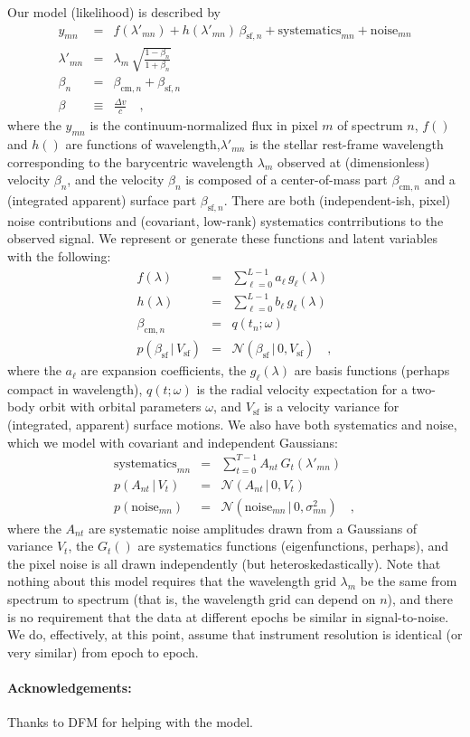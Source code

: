 \documentclass[12pt, letterpaper]{article}
\newcommand{\given}{\,|\,}
\newcommand{\normal}{{\mathcal{N}}}
\newcommand{\com}{\mathrm{cm}}
\newcommand{\surf}{\mathrm{sf}}
\begin{document}
Our model (likelihood) is described by
\begin{eqnarray}
  y_{mn} &=& f(\lambda'_{mn}) + h(\lambda'_{mn})\,\beta_{\surf, n} + \mathrm{systematics}_{mn} + \mathrm{noise}_{mn}
  \\
  \lambda'_{mn} &=& \lambda_m\,\sqrt{\frac{1 - \beta_n}{1 + \beta_n}}
  \\
  \beta_n &=& \beta_{\com,n} + \beta_{\surf, n}
  \\
  \beta &\equiv& \frac{\Delta v}{c}
  \quad , 
\end{eqnarray}
where the $y_{mn}$ is the continuum-normalized flux in pixel $m$ of
spectrum $n$, $f()$ and $h()$ are functions of
wavelength,$\lambda'_{mn}$ is the stellar rest-frame wavelength
corresponding to the barycentric wavelength $\lambda_m$ observed at
(dimensionless) velocity $\beta_n$, and the velocity $\beta_n$ is
composed of a center-of-mass part $\beta_{\com,n}$ and a (integrated
apparent) surface part $\beta_{\surf,n}$.
There are both (independent-ish, pixel) noise contributions and
(covariant, low-rank) systematics contrributions to the observed
signal.
We represent or generate these functions and latent variables
with the following:
\begin{eqnarray}
  f(\lambda) &=& \sum_{\ell=0}^{L-1} a_\ell\,g_\ell(\lambda)
  \\
  h(\lambda) &=& \sum_{\ell=0}^{L-1} b_\ell\,g_\ell(\lambda)
  \\
  \beta_{\com,n} &=& q(t_n; \omega)
  \\
  p(\beta_\surf \given V_\surf) &=& \normal(\beta_\surf \given 0, V_\surf)
  \quad ,
\end{eqnarray}
where the $a_\ell$ are expansion coefficients, the $g_\ell(\lambda)$
are basis functions (perhaps compact in wavelength), $q(t;\omega)$ is
the radial velocity expectation for a two-body orbit with orbital
parameters $\omega$, and $V_\surf$ is a velocity variance for
(integrated, apparent) surface motions.
We also have both systematics and noise, which we model with covariant
and independent Gaussians:
\begin{eqnarray}
  \mathrm{systematics}_{mn} &=& \sum_{t=0}^{T-1} A_{nt}\,G_t(\lambda'_{mn})
  \\
  p(A_{nt}\given V_t) &=& \normal(A_{nt}\given 0,V_t)
  \\
  p(\mathrm{noise}_{mn}) &=& \normal(\mathrm{noise}_{mn}\given 0,\sigma_{mn}^2)
  \quad ,
\end{eqnarray}
where the $A_{nt}$ are systematic noise amplitudes drawn from a
Gaussians of variance $V_t$, the $G_{t}()$ are systematics functions
(eigenfunctions, perhaps), and the pixel noise is all drawn
independently (but heteroskedastically).
Note that nothing about this model requires that the wavelength grid
$\lambda_m$ be the same from spectrum to spectrum (that is, the
wavelength grid can depend on $n$), and there is no requirement that
the data at different epochs be similar in signal-to-noise. We do,
effectively, at this point, assume that instrument resolution is
identical (or very similar) from epoch to epoch.


\paragraph{Acknowledgements:}
Thanks to DFM for helping with the model.
\end{document}
